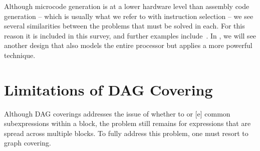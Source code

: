 Although \gls{microcode generation} is at a lower hardware level than
\gls{assembly code} generation -- which is usually what we refer to with
\gls{instruction selection} -- we see several similarities between the problems
that must be solved in each.
%
For this reason it is included in this survey, and further examples
include~\cite{BalakrishnanEtAl:1986, MahmoodEtAl:1990, LangevinCerny:1993}.
%
In , we will see another design that also models the
entire processor but applies a more powerful technique.


\section{Limitations of DAG Covering}

Although \glspl{DAG covering} addresses the issue of whether to  or [e] common subexpressions within a
\gls{block}, the problem still remains for expressions that are spread across
multiple \glspl{block}.
%
To fully address this problem, one must resort to \gls{graph covering}.

